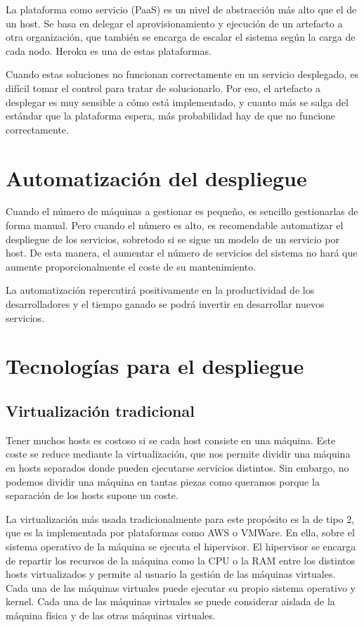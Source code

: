 \documentclass[11pt,a4paper]{article}
\begin{document}
La plataforma como servicio (PaaS) es un nivel de abstracción más alto que el de un host. Se basa en delegar el aprovisionamiento y ejecución de un artefacto a otra organización, que también se encarga de escalar el sistema según la carga de cada nodo. Heroku es una de estas plataformas.

Cuando estas soluciones no funcionan correctamente en un servicio desplegado, es difícil tomar el control para tratar de solucionarlo. Por eso, el artefacto a desplegar es muy sensible a cómo está implementado, y cuanto más se salga del estándar que la plataforma espera, más probabilidad hay de que no funcione correctamente.

\section{Automatización del despliegue}

Cuando el número de máquinas a gestionar es pequeño, es sencillo gestionarlas de forma manual. Pero cuando el número es alto, es recomendable automatizar el despliegue de los servicios, sobretodo si se sigue un modelo de un servicio por host. De esta manera, el aumentar el número de servicios del sistema no hará que aumente proporcionalmente el coste de su mantenimiento.

La automatización repercutirá positivamente en la productividad de los desarrolladores y el tiempo ganado se podrá invertir en desarrollar nuevos servicios. 

\section{Tecnologías para el despliegue}

\subsection{Virtualización tradicional}

Tener muchos hosts es costoso si se cada host consiste en una máquina. Este coste se reduce mediante la virtualización, que nos permite dividir una máquina en hosts separados donde pueden ejecutarse servicios distintos. Sin embargo, no podemos dividir una máquina en tantas piezas como queramos porque la separación de los hosts supone un coste.

La virtualización más usada tradicionalmente para este propósito es la de tipo 2, que es la implementada por plataformas como AWS o VMWare. En ella, sobre el sistema operativo de la máquina se ejecuta el hipervisor. El hipervisor se encarga de repartir los recursos de la máquina como la CPU o la RAM entre los distintos hosts virtualizados y permite al usuario la gestión de las máquinas virtuales. Cada una de las máquinas virtuales puede ejecutar su propio sistema operativo y kernel. Cada una de las  máquinas virtuales se puede considerar aislada de la máquina física y de las otras máquinas virtuales.
\end{document}

